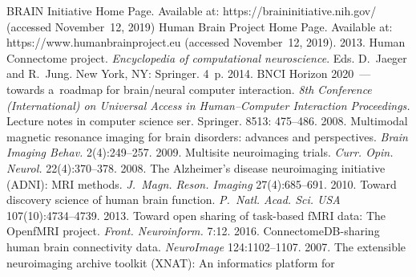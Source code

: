   \begin{multicols}{2}

\renewcommand{\bibname}{\protect\rmfamily References}

{\small\frenchspacing
 {%
 \begin{thebibliography}{99}
BRAIN Initiative Home Page. Available at: {\sf https://\linebreak braininitiative.nih.gov/} 
(accessed November~12, 2019)
Human Brain Project Home Page. Available at: {\sf 
https://\linebreak www.humanbrainproject.eu} (accessed November~12, 2019).
 2013. Human Connectome project. 
\textit{Encyclopedia of computational neuroscience}. Eds. D.~Jaeger and R.~Jung.
New York, NY: Springer.  4~p.
 2014. 
\mbox{BNCI} Horizon 
2020~--- towards a~roadmap for brain/neural computer interaction. \textit{8th 
 Conference (International) on Universal Access in Human--Computer 
Interaction Proceedings.} Lecture notes in computer science ser. Springer. 
8513: 475--486.
 2008. 
Multimodal magnetic resonance imaging for brain disorders: advances and 
perspectives. \textit{Brain Imaging Behav.} 2(4):249--257.
 2009. Multisite neuroimaging trials. 
\textit{Curr. Opin. Neurol.} 22(4):370--378. 
 2008. The 
Alzheimer's disease neuroimaging initiative (ADNI): MRI methods. 
\textit{J.~Magn. Reson. Imaging} 27(4):685--691.
 2010. Toward 
discovery science of human brain function. \textit{P.~Natl. 
Acad. Sci. USA} 107(10):4734--4739.
 2013. Toward 
open sharing of task-based fMRI data: The \mbox{OpenfMRI} project. \textit{Front. 
Neuroinform.} 7:12.
 2016. 
ConnectomeDB-sharing human brain connectivity data. \textit{NeuroImage} 
124:1102--1107.
 2007. The 
extensible neuroimaging archive toolkit (XNAT): An informatics platform for 

\end{thebibliography}}}
\end{multicols}
